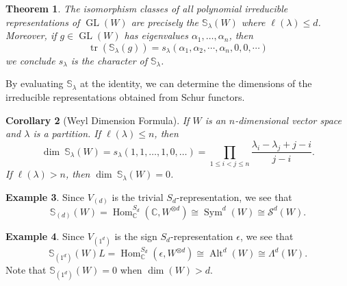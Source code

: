 \documentclass[12pt]{article}
\theoremstyle{plain}
\newtheorem{theorem}{Theorem}[section]
\newtheorem{corollary}[theorem]{Corollary}
\theoremstyle{definition}
\newtheorem{example}[theorem]{Example}
\theoremstyle{remark}
\numberwithin{equation}{section}
\begin{document}
\begin{theorem}
The isomorphism classes of all \emph{polynomial}
irreducible representations
of $\operatorname{GL}(W)$ are precisely the $\mathbb{S}_\lambda(W)$
where $\ell(\lambda) \le d$.
Moreover, if $g \in \operatorname{GL}(W)$ has eigenvalues
$\alpha_1,\ldots, \alpha_n$, then
\[
\operatorname{tr}(\mathbb{S}_\lambda(g)) = s_\lambda(\alpha_1,\alpha_2,\cdots,
\alpha_n,0,0,\cdots)
\]
we conclude $s_\lambda$ is the character of $\mathbb{S}_\lambda$.
\end{theorem}

By evaluating $\mathbb{S}_\lambda$ at the identity, we can determine the
dimensions of the irreducible representations obtained from Schur
functors.

\begin{corollary}[Weyl Dimension Formula]
If $W$ is an $n$-dimensional vector space and $\lambda$ is a partition.
If $\ell(\lambda) \le n$, then
\[
\dim\ \mathbb{S}_\lambda(W) = s_\lambda(1,1,\ldots,1,0,\ldots)
= \prod_{1 \le i < j \le n} \frac{\lambda_i-\lambda_j +  j - i}{j-i}.
\]
If $\ell(\lambda) > n$, then $\dim\ \mathbb{S}_\lambda(W) = 0$.
\end{corollary}

\begin{example}
Since $V_{(d)}$ is the trivial $S_d$-representation,
we see that
\[
\mathbb{S}_{(d)}(W) = \operatorname{Hom}^{S_d}_{\mathbb{C}}(\mathbb{C},W^{\otimes d})
\cong \operatorname{Sym}^d(W) \cong \mathcal{S}^d(W) .
\]
\end{example}

\begin{example}
Since $V_{(1^d)}$ is the sign $S_d$-representation $\epsilon$,
we see that
\[
\mathbb{S}_{(1^d)}(W)L = \operatorname{Hom}^{S_d}_{\mathbb{C}}(\epsilon,W^{\otimes d})
\cong \operatorname{Alt}^d(W) \cong \Lambda^d(W) .
\]
Note that $\mathbb{S}_{(1^d)}(W)=0$ when $\dim(W) > d$.
\end{example}



\end{document}

